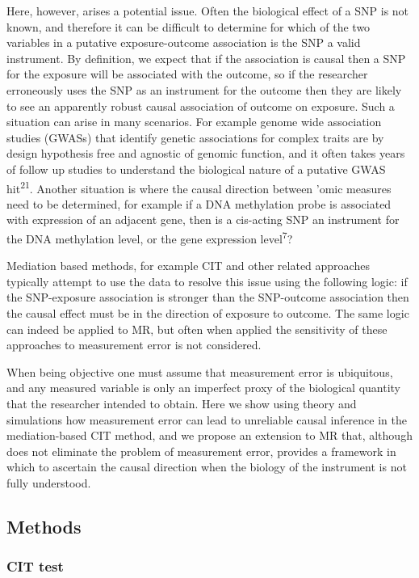\documentclass[]{article}
\begin{document}
Here, however, arises a potential issue. Often the biological effect of
a SNP is not known, and therefore it can be difficult to determine for
which of the two variables in a putative exposure-outcome association is
the SNP a valid instrument. By definition, we expect that if the
association is causal then a SNP for the exposure will be associated
with the outcome, so if the researcher erroneously uses the SNP as an
instrument for the outcome then they are likely to see an apparently
robust causal association of outcome on exposure. Such a situation can
arise in many scenarios. For example genome wide association studies
(GWASs) that identify genetic associations for complex traits are by
design hypothesis free and agnostic of genomic function, and it often
takes years of follow up studies to understand the biological nature of
a putative GWAS hit\textsuperscript{21}. Another situation is where the
causal direction between 'omic measures need to be determined, for
example if a DNA methylation probe is associated with expression of an
adjacent gene, then is a cis-acting SNP an instrument for the DNA
methylation level, or the gene expression level\textsuperscript{7}?

Mediation based methods, for example CIT and other related approaches
typically attempt to use the data to resolve this issue using the
following logic: if the SNP-exposure association is stronger than the
SNP-outcome association then the causal effect must be in the direction
of exposure to outcome. The same logic can indeed be applied to MR, but
often when applied the sensitivity of these approaches to measurement
error is not considered.

When being objective one must assume that measurement error is
ubiquitous, and any measured variable is only an imperfect proxy of the
biological quantity that the researcher intended to obtain. Here we show
using theory and simulations how measurement error can lead to
unreliable causal inference in the mediation-based CIT method, and we
propose an extension to MR that, although does not eliminate the problem
of measurement error, provides a framework in which to ascertain the
causal direction when the biology of the instrument is not fully
understood.

\subsection{Methods}\label{methods}

\subsubsection{CIT test}\label{cit-test}
\end{document}

